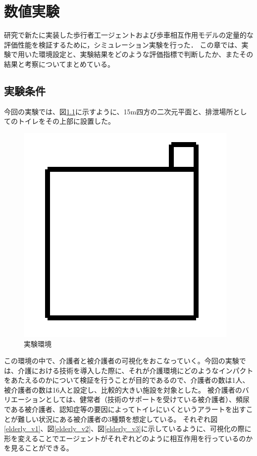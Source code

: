 \chapter{数値実験}

研究で新たに実装した歩行者工一ジェントおよび歩車相互作用モデルの定量的な評価性能を検証するために，シミュレーション実験を行った．
この章では、実験で用いた環境設定と、実験結果をどのような評価指標で判断したか、またその結果と考察についてまとめている。

\section{実験条件}

今回の実験では、図\ref{environment}に示すように、15m四方の二次元平面と、排泄場所としてのトイレをその上部に設置した。

\begin{figure}[htb]
\begin{center}
 \includegraphics[scale=0.6]{figures/environment.png}
 \caption[実験環境]{実験環境 \label{environment}}
\end{center}
\end{figure}

この環境の中で、介護者と被介護者の可視化をおこなっていく。今回の実験では、介護における技術を導入した際に、それが介護環境にどのようなインパクトをあたえるのかについて検証を行うことが目的であるので、介護者の数は1人、被介護者の数は16人と設定し、比較的大きい施設を対象とした。
被介護者のバリエーションとしては、健常者（技術のサポートを受けている被介護者）、頻尿である被介護者、認知症等の要因によってトイレにいくというアラートを出すことが難しい状況にある被介護者の3種類を想定している。
それぞれ図\ref{elderly_v1}、図\ref{elderly_v2}、図\ref{elderly_v3}に示しているように、可視化の際に形を変えることでエージェントがそれぞれどのように相互作用を行っているのかを見ることができる。

